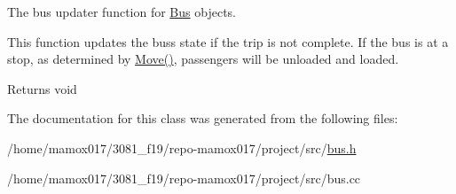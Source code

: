 The bus updater function for \hyperlink{classBus}{Bus} objects. 

This function updates the bus\textquotesingle{}s state if the trip is not complete. If the bus is at a stop, as determined by \hyperlink{classBus_a5e667186d6db0916ebab0e4eff3312c8}{Move()}, passengers will be unloaded and loaded.

\begin{DoxyReturn}{Returns}
void 
\end{DoxyReturn}


The documentation for this class was generated from the following files\+:\begin{DoxyCompactItemize}
\item 
/home/mamox017/3081\+\_\+f19/repo-\/mamox017/project/src/\hyperlink{bus_8h}{bus.\+h}\item 
/home/mamox017/3081\+\_\+f19/repo-\/mamox017/project/src/bus.\+cc\end{DoxyCompactItemize}
